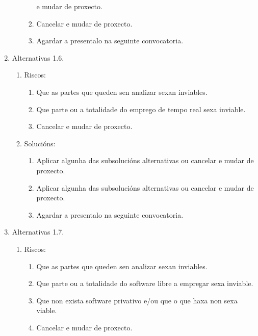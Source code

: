 \begin{enumerate}
\begin{enumerate}
\begin{enumerate}
                      e mudar de proxecto.
                \item Cancelar e mudar de proxecto.
                \item Agardar a presentalo na seguinte convocatoria.
               \end{enumerate}
        \end{enumerate}
  \item Alternativas 1.6.
        \begin{enumerate}
         \item Riscos:
               \begin{enumerate}
                \item Que as partes que queden sen analizar sexan inviables.
                \item Que parte ou a totalidade do emprego de tempo real sexa
                      inviable.
                \item Cancelar e mudar de proxecto.
               \end{enumerate}
         \item Solucións:
               \begin{enumerate}
                \item Aplicar algunha das subsolucións alternativas ou cancelar
                      e mudar de proxecto.
                \item Aplicar algunha das subsolucións alternativas ou cancelar
                      e mudar de proxecto.
                \item Agardar a presentalo na seguinte convocatoria.
               \end{enumerate}
        \end{enumerate}
  \item Alternativas 1.7.
        \begin{enumerate}
         \item Riscos:
               \begin{enumerate}
                \item Que as partes que queden sen analizar sexan inviables.
                \item Que parte ou a totalidade do software libre a empregar
                      sexa inviable.
                \item Que non exista software privativo e/ou que o que haxa non
                      sexa viable.
                \item Cancelar e mudar de proxecto.
               \end{enumerate}

\end{enumerate}
\end{enumerate}

